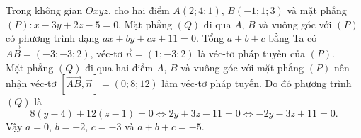 \begin{ex}%
	Trong không gian $Oxyz$, cho hai điểm $A(2;4;1)$, $B(-1;1;3)$ và mặt phẳng $(P)\colon x-3y+2z-5=0$. Mặt phẳng $(Q)$ đi qua $A$, $B$ và vuông góc với $(P)$ có phương trình dạng $ax+by+cz+11=0$. Tổng $a+b+c$ bằng
	\loigiai
	{Ta có $\overrightarrow{AB}=(-3;-3;2)$, véc-tơ $\overrightarrow{n}=(1;-3;2)$ là véc-tơ pháp tuyến của $(P)$.\\
		Mặt phẳng $(Q)$ đi qua hai điểm $A$, $B$ và vuông góc với mặt phẳng $(P)$ nên nhận véc-tơ $\left[\overrightarrow{AB}, \overrightarrow{n}\right] = (0;8;12)$ làm véc-tơ pháp tuyến. Do đó phương trình $(Q)$ là
		$$8(y-4)+12(z-1)=0 \Leftrightarrow 2y+3z-11=0 \Leftrightarrow -2y-3z+11=0.$$
		Vậy $a=0$, $b=-2$, $c=-3$ và $a+b+c=-5$.}
\end{ex}


